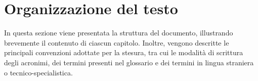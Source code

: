 \section{Organizzazione del testo}
In questa sezione viene presentata la struttura del documento, illustrando brevemente il contenuto di ciascun capitolo. Inoltre, vengono descritte le principali convenzioni adottate per la stesura, tra cui le modalità di scrittura degli acronimi, dei termini presenti nel glossario e dei termini in lingua straniera o tecnico-specialistica.
    
    
    
    
    



\newpage